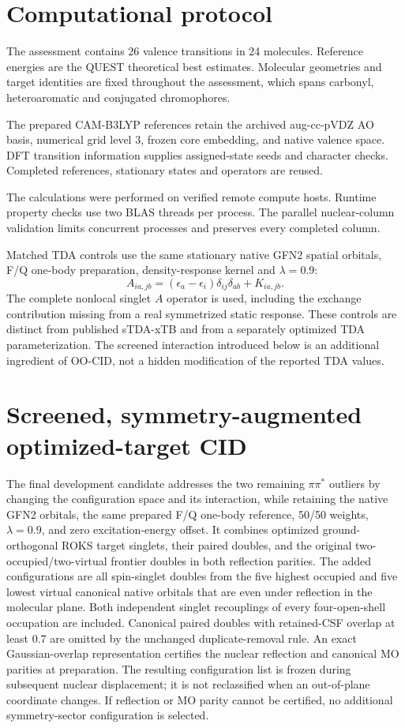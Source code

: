 \documentclass[11pt,a4paper]{article}
\begin{document}
\section{Computational protocol}
The assessment contains 26 valence transitions in 24 molecules. Reference
energies are the QUEST theoretical best estimates.\cite{quest,quest2025}
Molecular geometries and target identities are fixed throughout the
assessment, which spans carbonyl, heteroaromatic and conjugated chromophores.

The prepared CAM-B3LYP references retain the archived aug-cc-pVDZ AO basis,
numerical grid level 3, frozen core embedding, and native valence space.
DFT transition information supplies assigned-state seeds and character checks.
Completed references, stationary states and operators are reused.

The calculations were performed on verified remote compute hosts. Runtime
property checks use two BLAS threads per process. The parallel nuclear-column
validation limits concurrent processes and preserves every completed column.

Matched TDA controls use the same stationary native GFN2 spatial orbitals,
F/Q one-body preparation, density-response kernel and $\lambda=0.9$:
\begin{equation}
 A_{ia,jb}=(\epsilon_a-\epsilon_i)\delta_{ij}\delta_{ab}+K_{ia,jb}.
\end{equation}
The complete nonlocal singlet $A$ operator is used, including the exchange
contribution missing from a real symmetrized static response. These controls
are distinct from published sTDA-xTB and from a separately optimized TDA
parameterization. The screened interaction introduced below is an additional
ingredient of OO-CID, not a hidden modification of the reported TDA values.

\section{Screened, symmetry-augmented optimized-target CID}
The final development candidate addresses the two remaining $\pi\pi^*$
outliers by changing the configuration space and its interaction, while
retaining the native GFN2 orbitals, the same prepared F/Q one-body reference,
50/50 weights, $\lambda=0.9$, and zero excitation-energy offset. It combines
optimized ground-orthogonal ROKS target singlets, their paired doubles,
and the original two-occupied/two-virtual frontier doubles in both reflection
parities. The added configurations are all spin-singlet doubles from the
five highest occupied and five lowest virtual canonical native orbitals
that are even under reflection in the molecular plane. Both independent
singlet recouplings of every four-open-shell occupation are included.
Canonical paired doubles with retained-CSF overlap at least 0.7 are
omitted by the unchanged duplicate-removal rule.
An exact Gaussian-overlap representation certifies the nuclear reflection
and canonical MO parities at preparation. The resulting configuration list
is frozen during subsequent nuclear displacement; it is not reclassified
when an out-of-plane coordinate changes. If reflection or MO parity cannot
be certified, no additional symmetry-sector configuration is selected.
\end{document}
